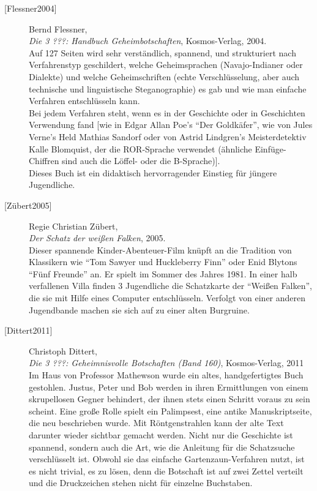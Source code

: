 \begin{refsegment}
\begin{description}
\item[\textrm{[Flessner2004]}] 
    Bernd Flessner, \\
    {\em Die 3 ???: Handbuch Geheimbotschaften},
    Kosmos-Verlag, 2004. \\
    Auf 127 Seiten wird sehr verständlich, spannend, und strukturiert nach
    Verfahrenstyp geschildert, welche Geheimsprachen (Navajo-Indianer oder
    Dialekte) und welche Geheimschriften (echte Verschlüsselung, aber auch
    technische und linguistische Steganographie) es gab und wie man
    einfache Verfahren entschlüsseln kann.\\
    Bei jedem Verfahren steht, wenn es in der Geschichte oder in Geschichten
    Verwendung fand [wie in Edgar Allan Poe's "`Der Goldkäfer"', wie von
    Jules Verne's Held Mathias Sandorf oder von Astrid Lindgren's
    Meisterdetektiv Kalle Blomquist, der die ROR-Sprache verwendet
    (ähnliche Einfüge-Chiffren sind auch die Löffel- oder die B-Sprache)].
    \\
    Dieses Buch ist ein didaktisch hervorragender Einstieg für jüngere
    Jugendliche.\\


\item[\textrm{[Zübert2005]}] 
    Regie Christian Zübert, \\
    {\em Der Schatz der weißen Falken}, 2005. \\
    Dieser spannende Kinder-Abenteuer-Film knüpft an die Tradition von
    Klassikern wie "`Tom Sawyer und Huckleberry Finn"' oder Enid Blytons
    "`Fünf Freunde"' an. Er spielt im Sommer des Jahres 1981.
    In einer halb verfallenen Villa finden 3 Jugendliche die Schatzkarte
    der "`Weißen Falken"', die sie mit Hilfe eines Computer entschlüsseln.
    Verfolgt von einer anderen Jugendbande machen sie sich auf zu einer
    alten Burgruine.\\


\item[\textrm{[Dittert2011]}] 
    Christoph Dittert, \\
    {\em Die 3 ???: Geheimnisvolle Botschaften (Band 160)},
    Kosmos-Verlag, 2011 \\
    Im Haus von Professor Mathewson wurde ein altes, handgefertigtes Buch gestohlen.
    Justus, Peter und Bob werden in ihren Ermittlungen von einem skrupellosen Gegner
    behindert, der ihnen stets einen Schritt voraus zu sein scheint.
    Eine große Rolle spielt ein Palimpsest, eine antike Manuskriptseite, die neu
    beschrieben wurde. Mit Röntgenstrahlen kann der alte Text darunter wieder sichtbar
    gemacht werden.
    Nicht nur die Geschichte ist spannend, sondern auch die Art, wie die Anleitung für
    die Schatzsuche verschlüsselt ist. Obwohl sie das einfache Gartenzaun-Verfahren
    nutzt, ist es nicht trivial, es zu lösen, denn die Botschaft ist auf zwei Zettel
    verteilt und die Druckzeichen stehen nicht für einzelne Buchstaben.\\





\end{description}
\end{refsegment}
